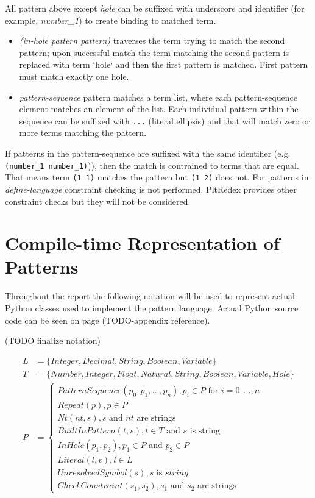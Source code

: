 All pattern above except \textit{hole} can be suffixed with underscore and identifier (for example, \textit{number\_1}) to create binding to matched term.

\begin{itemize}
\item
\textit{(in-hole pattern pattern)} traverses the term trying to match the second pattern; upon successful match the term matching the second pattern is replaced with term `hole` and then the first pattern is matched. First pattern must match exactly one hole.

\item

\textit{pattern-sequence} pattern matches a term list, where each pattern-sequence element matches an element of the list. Each individual pattern within the sequence can be suffixed with \texttt{...} (literal ellipsis) and that will match zero or more terms matching the pattern.
\end{itemize}

If patterns in the pattern-sequence are suffixed with the same identifier (e.g. \texttt{(number\_1 number\_1)})), then the match is contrained to terms that are equal. That means term \texttt{(1 1)} matches the pattern but \texttt{(1 2)} does not. For patterns in \textit{define-language} constraint checking is not performed. PltRedex provides other constraint checks but they will not be considered.

\section{Compile-time Representation of Patterns}

Throughout the report the following notation will be used to represent actual Python classes used to implement the pattern language. Actual Python source code can be seen on page (TODO-appendix reference). 

(TODO finalize notation)

\begin{align}
	L &= \{ Integer, Decimal, String, Boolean, Variable \} \\ 
	T &= \{ Number, Integer, Float, Natural, String, Boolean, Variable, Hole \} \\ 
	P &= 
	\begin{cases}
	PatternSequence(p_0, p_1, ..., p_n), p_i \in P \text { for } i=0,...,n \\ 
	Repeat(p), p \in P \\
	Nt(nt, s), s \text{ and } nt \text{ are strings} \\
	BuiltInPattern(t, s), t \in T \text{ and } s \text{ is string } \\
	InHole(p_1, p_2), p_1 \in P \text{ and } p_2 \in P \\
	Literal(l, v), l \in L \\
	UnresolvedSymbol(s), s \text{ is } string \\
	CheckConstraint(s_1, s_2), s_1 \text{ and } s_2 \text{ are strings}
	\end{cases}
\end{align}


